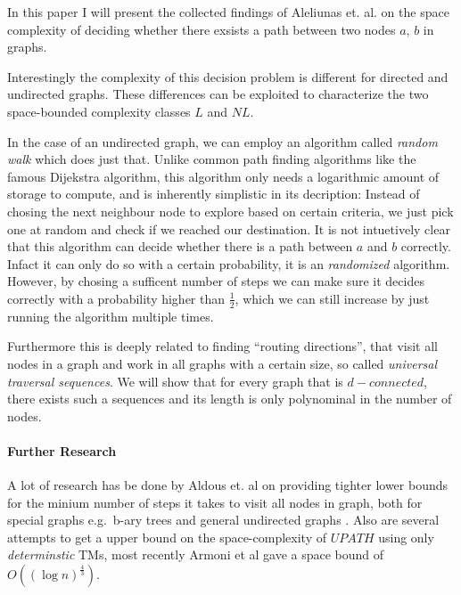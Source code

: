 


\newtheorem{thm}{Theorem}

In this paper I will present the collected findings of Aleliunas et. al.
 on the space complexity of deciding
whether there exsists a path between two nodes $a$, $b$ in graphs.

Interestingly the complexity of this decision problem is different for
directed and undirected graphs. These differences can be exploited to
characterize the two space-bounded complexity classes $L$ and $NL$.

In the case of an undirected graph, we can employ an algorithm called
\emph{random walk} which does just that. Unlike common path finding
algorithms like the famous Dijekstra algorithm, this algorithm only
needs a logarithmic amount of storage to compute, and is inherently
simplistic in its decription: Instead of chosing the next neighbour node
to explore based on certain criteria, we just pick one at random and
check if we reached our destination. It is not intuetively clear that
this algorithm can decide whether there is a path between $a$ and $b$
correctly. Infact it can only do so with a certain probability, it is an
\emph{randomized} algorithm. However, by chosing a sufficent number of
steps we can make sure it decides correctly with a probability higher
than $\frac{1}{2}$, which we can still increase by just running the
algorithm multiple times.

Furthermore this is deeply related to finding ``routing directions'',
that visit all nodes in a graph and work in all graphs with a certain
size, so called \emph{universal traversal sequences}. We will show that
for every graph that is $d-connected$, there exists such a sequences and
its length is only polynominal in the number of nodes.

\paragraph{Further Research}\label{further-research}

A lot of research has be done by Aldous et. al on providing tighter
lower bounds for the minium number of steps it takes to visit all nodes
in graph, both for special graphs e.g.~b-ary trees
 and general undirected graphs
. Also are several attempts to get a upper
bound on the space-complexity of $UPATH$ using only \emph{determinstic}
TMs, most recently Armoni et al  gave a space
bound of $O((\log n)^{\frac{4}{3}})$.

